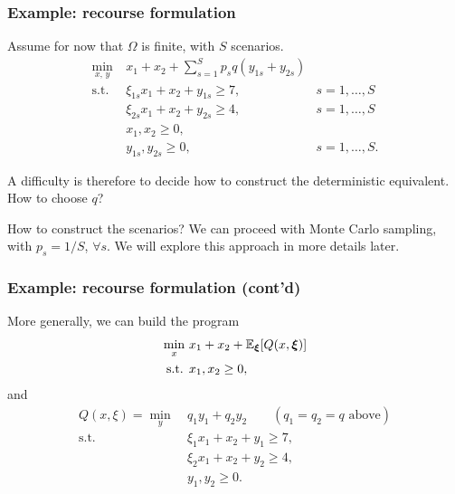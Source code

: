 \documentclass[aspectratio=169]{beamer}
\begin{document}
\begin{frame}
	\frametitle{Example: recourse formulation}
	
	Assume for now that $\Omega$ is finite, with $S$ scenarios.
	\begin{align*}
	\min_{x,\, y}\ & x_1+x_2 + \sum_{s = 1}^{S} p_s q (y_{1s} + y_{2s})\\
	\mbox{s.t. } & \xi_{1s}x_1 + x_2 + y_{1s} \geq 7, & s = 1,\ldots,S \\
	& \xi_{2s}x_1 + x_2 + y_{2s} \geq 4, & s = 1,\ldots,S \\
	& x_1, x_2 \geq 0,\\
	& y_{1s}, y_{2s} \geq 0, & s = 1,\ldots,S.
	\end{align*}
	
	A difficulty is therefore to decide how to construct the deterministic equivalent.
	How to choose $q$?
	
	\mbox{}
	
	How to construct the scenarios?
	We can proceed with Monte Carlo sampling, with $p_s = 1/S$, $\forall s$.
	We will explore this approach in more details later.
	
\end{frame}

\begin{frame}
	\frametitle{Example: recourse formulation (cont'd)}
	
	More generally, we can build the program
	\begin{align*}
	\min_x\ & x_1+x_2 + {\mathbb{E}}_{{\boldsymbol{\xi}}}[Q(x,{\boldsymbol{\xi}})] \\
	\mbox{s.t. } & x_1, x_2 \geq 0,
	\end{align*}
	and
	\begin{align*}
	Q(x, \xi) = \min_y\ & q_1y_1 + q_2y_2 \qquad (q_1 = q_2 = q \text{ above}) \\
	\mbox{s.t. } & \xi_1 x_1 + x_2 + y_1 \geq 7, \\
	& \xi_2 x_1 + x_2 + y_2 \geq 4, \\
	& y_1, y_2 \geq 0.
	\end{align*}
	
\end{frame}
\end{document}
